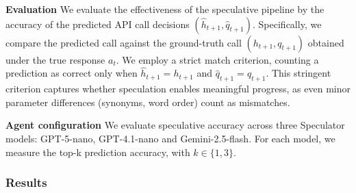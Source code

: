 
\textbf{Evaluation}
We evaluate the effectiveness of the speculative pipeline by the accuracy of the predicted API call decisions $(\hat{h}_{t+1}, \hat{q}_{t+1})$. Specifically, we compare the predicted call against the ground-truth call $(h_{t+1}, q_{t+1})$ obtained under the true response $a_t$. We employ a strict match criterion, counting a prediction as correct only when $\hat{h}_{t+1} = h_{t+1}$ and $\hat{q}_{t+1} = q_{t+1}$. This stringent criterion captures whether speculation enables meaningful progress, as even minor parameter differences (synonyms, word order) count as mismatches.

\textbf{Agent configuration}
We evaluate speculative accuracy across three Speculator models: GPT-5-nano, GPT-4.1-nano and Gemini-2.5-flash. For each model, we measure the top-k prediction accuracy, with ${k \in \{1,3\}}$.
\subsubsection{Results}


